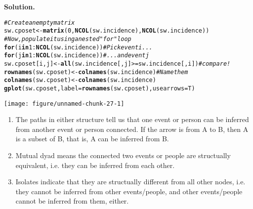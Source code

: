 \documentclass[11pt, oneside]{article}\usepackage[]{graphicx}\usepackage[]{color}
\makeatletter
\def\maxwidth{ %
  \ifdim\Gin@nat@width>\linewidth
    \linewidth
  \else
    \Gin@nat@width
  \fi
}
\newcommand{\hlnum}[1]{\textcolor[rgb]{0.686,0.059,0.569}{#1}}%
\newcommand{\hlcom}[1]{\textcolor[rgb]{0.678,0.584,0.686}{\textit{#1}}}%
\newcommand{\hlopt}[1]{\textcolor[rgb]{0,0,0}{#1}}%
\newcommand{\hlstd}[1]{\textcolor[rgb]{0.345,0.345,0.345}{#1}}%
\newcommand{\hlkwa}[1]{\textcolor[rgb]{0.161,0.373,0.58}{\textbf{#1}}}%
\newcommand{\hlkwb}[1]{\textcolor[rgb]{0.69,0.353,0.396}{#1}}%
\newcommand{\hlkwc}[1]{\textcolor[rgb]{0.333,0.667,0.333}{#1}}%
\newcommand{\hlkwd}[1]{\textcolor[rgb]{0.737,0.353,0.396}{\textbf{#1}}}%
\newenvironment{kframe}{%
 \def\at@end@of@kframe{}%
 \ifinner\ifhmode%
  \def\at@end@of@kframe{\end{minipage}}%
  \begin{minipage}{\columnwidth}%
 \fi\fi%
 \def\FrameCommand##1{\hskip\@totalleftmargin \hskip-\fboxsep
 \colorbox{shadecolor}{##1}\hskip-\fboxsep
     \hskip-\linewidth \hskip-\@totalleftmargin \hskip\columnwidth}%
 \MakeFramed {\advance\hsize-\width
   \@totalleftmargin\z@ \linewidth\hsize
   \@setminipage}}%
 {\par\unskip\endMakeFramed%
 \at@end@of@kframe}
\newenvironment{knitrout}{}{} %
\newenvironment{solution}{\begin{trivlist} \item \textbf{Solution.}}{\end{trivlist}}
\newenvironment{prob}[2][Problem]{\begin{trivlist}
\item[\hskip \labelsep {\bfseries #1}\hskip \labelsep {\bfseries #2.}]}{\end{trivlist}}
\makeatother
\begin{document}
\begin{prob}{2}
\begin{enumerate}
\begin{solution}
\begin{knitrout}
\end{knitrout}
\begin{knitrout}
\color{fgcolor}\begin{kframe}
\begin{alltt}
\hlcom{#Create an empty matrix}
\hlstd{sw.cposet}\hlkwb{<-}\hlkwd{matrix}\hlstd{(}\hlnum{0}\hlstd{,}\hlkwd{NCOL}\hlstd{(sw.incidence),} \hlkwd{NCOL}\hlstd{(sw.incidence))}
\hlcom{#Now, populate it using a nested "for" loop}
\hlkwa{for}\hlstd{(i} \hlkwa{in} \hlnum{1}\hlopt{:}\hlkwd{NCOL}\hlstd{(sw.incidence))} \hlcom{#Pick event i...}
  \hlkwa{for}\hlstd{(j} \hlkwa{in} \hlnum{1}\hlopt{:}\hlkwd{NCOL}\hlstd{(sw.incidence))} \hlcom{# ... and event j}
    \hlstd{sw.cposet[i,j]}\hlkwb{<-}\hlkwd{all}\hlstd{(sw.incidence[,j]}\hlopt{>=}\hlstd{sw.incidence[,i])}\hlcom{#compare!}
\hlkwd{rownames}\hlstd{(sw.cposet)}\hlkwb{<-}\hlkwd{colnames}\hlstd{(sw.incidence)} \hlcom{#Name them}
\hlkwd{colnames}\hlstd{(sw.cposet)}\hlkwb{<-}\hlkwd{colnames}\hlstd{(sw.incidence)}
\hlkwd{gplot}\hlstd{(sw.cposet,}\hlkwc{label}\hlstd{=}\hlkwd{rownames}\hlstd{(sw.cposet),}\hlkwc{usearrows}\hlstd{=T)}
\end{alltt}
\end{kframe}

{\centering \texttt{[image: figure/unnamed-chunk-27-1]} 

}



\end{knitrout}

  \begin{enumerate}
  \item The paths in either structure tell us that one event or person can be inferred 
from another event or person connected. If the arrow is from A to B, then A is a subset of 
B, that is, A can be inferred from B.
  \item Mutual dyad means the connected two events or people are structually equivalent, 
i.e. they can be inferred from each other.
  \item Isolates indicate that they are structually different from all other nodes, i.e. 
they cannot be inferred from other events/people, and other events/people cannot be 
inferred from them, either.
  \end{enumerate}
\end{solution}

\end{enumerate}

\end{prob}
\end{document}
